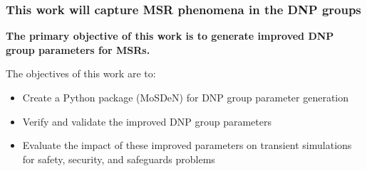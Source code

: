 \begin{frame}
  \frametitle{This work will capture \gls{MSR} phenomena in the \gls{DNP} groups}
        \textbf{The primary objective of this work is to generate improved \gls{DNP} group parameters for \glspl{MSR}.}

        \begin{block}{The objectives of this work are to:}
            \begin{itemize}
		    \item {} Create a Python package (\gls{MoSDeN}) for \gls{DNP} group parameter generation
                \item {} Verify and validate the improved \gls{DNP} group parameters
                \item {} Evaluate the impact of these improved parameters on transient simulations for safety, security, and safeguards problems
            \end{itemize}
        \end{block}

\end{frame}
